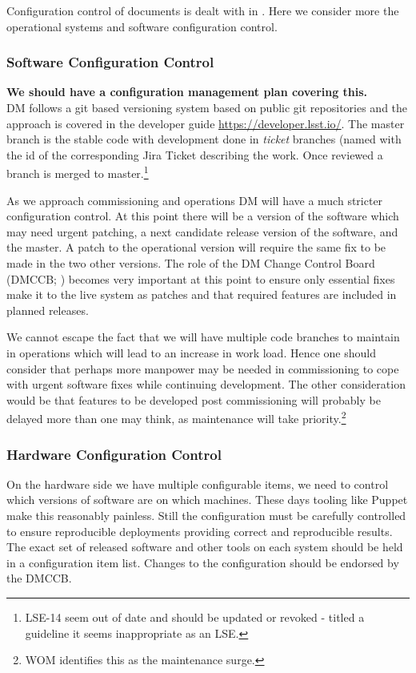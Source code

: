 Configuration control of documents is dealt with in . Here we consider more the operational systems and software configuration control.

\subsubsection{Software Configuration Control}

{\bf We should have a configuration management plan covering this.} \\

DM follows a git based versioning system based  on public git repositories and the approach is covered in the developer guide \url{https://developer.lsst.io/}.
The master branch is the stable code with development done in {\em ticket} branches (named with the id of the corresponding Jira Ticket describing the work.
Once reviewed a branch is merged to master.\footnote{LSE-14 seem out of date and should be updated or revoked - titled a guideline it seems inappropriate as an LSE.}

As we approach commissioning and operations DM will have a much stricter configuration control.
At this point there will be a version of the software which may need urgent patching, a next candidate release version of the software, and the master.
A patch to the operational version will require the same fix to be made in the two other versions.
The role of the DM Change Control Board (DMCCB; ) becomes very important at this point to ensure only essential fixes make it to the live system as patches and that required features are included in planned releases.

We cannot escape the fact that we  will have multiple code branches to maintain in operations which will lead to an increase in work load.
Hence one should consider that perhaps more manpower may be needed in commissioning to cope with urgent software fixes while continuing development.
The other consideration would be that features to be developed post commissioning will probably be delayed more than one may think, as maintenance will take priority.\footnote{WOM identifies this as the maintenance surge.}

\subsubsection{Hardware Configuration Control}

On the hardware side we have multiple configurable items, we need to control which versions of software are on which machines. These days tooling like Puppet make this reasonably painless. Still the configuration  must be carefully controlled to ensure reproducible deployments providing correct and reproducible results. The exact set of released software and other tools on each system should be held in a configuration item list.
Changes to the configuration should be endorsed by the DMCCB.

